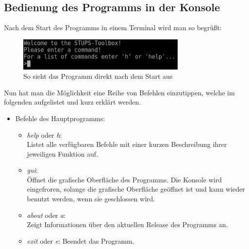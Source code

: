 \subsection{Bedienung des Programms in der Konsole}
\label{sec:2.3}
Nach dem Start des Programms in einem Terminal wird man so begrüßt:
\begin{figure}[H]
	\centering
	\includegraphics[width=0.75\textwidth]{bilder/konsole1.png}
	\caption{So sieht das Programm direkt nach dem Start aus}
	\label{fig:pic3}
\end{figure}
Nun hat man die Möglichkeit eine Reihe von Befehlen einzutippen, welche im folgenden aufgelistet und kurz erklärt werden.
\begin{itemize}
	\item Befehle des Hauptprogramms:
	\begin{itemize}
		\item \textit{help} oder \textit{h}:\\
		Listet alle verfügbaren Befehle mit einer kurzen Beschreibung ihrer jeweiligen Funktion auf.
		\item \textit{gui}:\\
		Öffnet die grafische Oberfläche des Programms. Die Konsole wird eingefroren, solange die grafische Oberfläche geöffnet ist und kann wieder benutzt werden, wenn sie geschlossen wird.
		\item \textit{about} oder \textit{a}:\\
		Zeigt Informationen über den aktuellen Release des Programms an.
		\item \textit{exit} oder \textit{e}:
		Beendet das Programm.
	\end{itemize}
\end{itemize}
